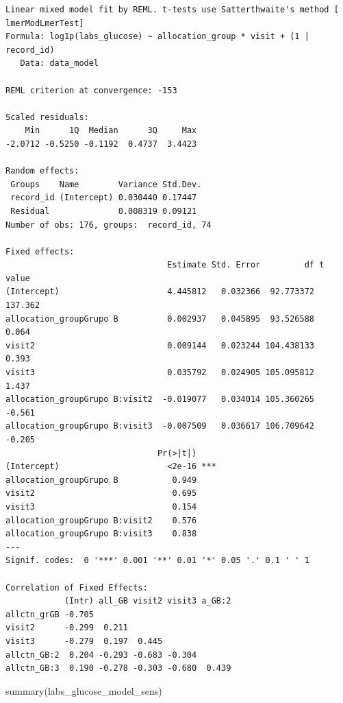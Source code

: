 \documentclass[
  letterpaper,
  DIV=11,
  numbers=noendperiod]{scrartcl}
\newenvironment{Shaded}{\begin{snugshade}}{\end{snugshade}}
\newcommand{\FunctionTok}[1]{\textcolor[rgb]{0.28,0.35,0.67}{#1}}
\newcommand{\NormalTok}[1]{\textcolor[rgb]{0.00,0.23,0.31}{#1}}
\begin{document}
\begin{verbatim}
Linear mixed model fit by REML. t-tests use Satterthwaite's method [
lmerModLmerTest]
Formula: log1p(labs_glucose) ~ allocation_group * visit + (1 | record_id)
   Data: data_model

REML criterion at convergence: -153

Scaled residuals: 
    Min      1Q  Median      3Q     Max 
-2.0712 -0.5250 -0.1192  0.4737  3.4423 

Random effects:
 Groups    Name        Variance Std.Dev.
 record_id (Intercept) 0.030440 0.17447 
 Residual              0.008319 0.09121 
Number of obs: 176, groups:  record_id, 74

Fixed effects:
                                 Estimate Std. Error         df t value
(Intercept)                      4.445812   0.032366  92.773372 137.362
allocation_groupGrupo B          0.002937   0.045895  93.526588   0.064
visit2                           0.009144   0.023244 104.438133   0.393
visit3                           0.035792   0.024905 105.095812   1.437
allocation_groupGrupo B:visit2  -0.019077   0.034014 105.360265  -0.561
allocation_groupGrupo B:visit3  -0.007509   0.036617 106.709642  -0.205
                               Pr(>|t|)    
(Intercept)                      <2e-16 ***
allocation_groupGrupo B           0.949    
visit2                            0.695    
visit3                            0.154    
allocation_groupGrupo B:visit2    0.576    
allocation_groupGrupo B:visit3    0.838    
---
Signif. codes:  0 '***' 0.001 '**' 0.01 '*' 0.05 '.' 0.1 ' ' 1

Correlation of Fixed Effects:
            (Intr) all_GB visit2 visit3 a_GB:2
allctn_grGB -0.705                            
visit2      -0.299  0.211                     
visit3      -0.279  0.197  0.445              
allctn_GB:2  0.204 -0.293 -0.683 -0.304       
allctn_GB:3  0.190 -0.278 -0.303 -0.680  0.439
\end{verbatim}

\begin{Shaded}
\begin{Highlighting}[]
\FunctionTok{summary}\NormalTok{(labs\_glucose\_model\_sens)}
\end{Highlighting}
\end{Shaded}
\end{document}
